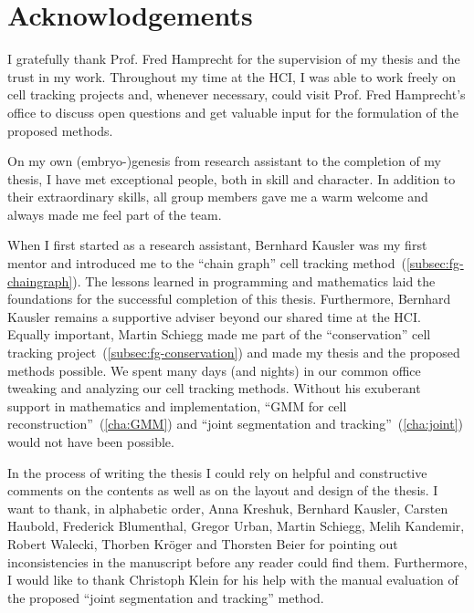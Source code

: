 \chapter{Acknowlodgements}

I gratefully thank Prof. Fred Hamprecht for the supervision of my thesis and the trust in my
work. Throughout my time at the HCI, I was able to work freely on cell tracking projects and,
whenever necessary, could visit Prof. Fred Hamprecht's office to discuss open questions and get
valuable input for the formulation of the proposed methods.

On my own (embryo-)genesis from research assistant to the completion of my thesis, I have met
exceptional people, both in skill and character. In addition to their extraordinary skills, all
group members gave me a warm welcome and always made me feel part of the team.

When I first started as a research assistant, Bernhard Kausler was my first mentor and introduced me
to the ``chain graph'' cell tracking method~(\cref{subsec:fg-chaingraph}). The lessons learned in
programming and mathematics laid the foundations for the successful completion of this
thesis. Furthermore, Bernhard Kausler remains a supportive adviser beyond our shared time at the
HCI. Equally important, Martin Schiegg made me part of the ``conservation'' cell tracking
project~(\cref{subsec:fg-conservation}) and made my thesis and the proposed methods possible. We
spent many days (and nights) in our common office tweaking and analyzing our cell tracking
methods. Without his exuberant support in mathematics and implementation, ``GMM for cell
reconstruction''~(\cref{cha:GMM}) and ``joint segmentation and tracking''~(\cref{cha:joint}) would
not have been possible.

In the process of writing the thesis I could rely on helpful and constructive comments on the
contents as well as on the layout and design of the thesis. I want to thank, in alphabetic order,
Anna Kreshuk, Bernhard Kausler, Carsten Haubold, Frederick Blumenthal, Gregor Urban, Martin Schiegg,
Melih Kandemir, Robert Walecki, Thorben Kr\"oger and Thorsten Beier for pointing out inconsistencies
in the manuscript before any reader could find them.  Furthermore, I would like to thank Christoph
Klein for his help with the manual evaluation of the proposed ``joint segmentation and tracking''
method.

